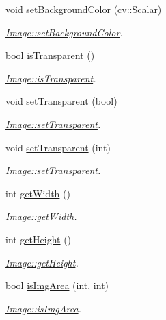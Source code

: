 \begin{DoxyCompactItemize}
void \mbox{\hyperlink{class_image_a4262b756a7298a7b6f5ad840c56b41e6}{set\+Background\+Color}} (cv\+::\+Scalar)
\begin{DoxyCompactList}\small\item\em \mbox{\hyperlink{class_image_a4262b756a7298a7b6f5ad840c56b41e6}{Image\+::set\+Background\+Color}}. \end{DoxyCompactList}\item 
bool \mbox{\hyperlink{class_image_a2bfbc65ec280b866411462f7b452ce76}{is\+Transparent}} ()
\begin{DoxyCompactList}\small\item\em \mbox{\hyperlink{class_image_a2bfbc65ec280b866411462f7b452ce76}{Image\+::is\+Transparent}}. \end{DoxyCompactList}\item 
void \mbox{\hyperlink{class_image_a52e45825bdd0de9b53c36b1a80936cca}{set\+Transparent}} (bool)
\begin{DoxyCompactList}\small\item\em \mbox{\hyperlink{class_image_a52e45825bdd0de9b53c36b1a80936cca}{Image\+::set\+Transparent}}. \end{DoxyCompactList}\item 
void \mbox{\hyperlink{class_image_aa33101892a02308ad3de2f7eaf22a7a5}{set\+Transparent}} (int)
\begin{DoxyCompactList}\small\item\em \mbox{\hyperlink{class_image_a52e45825bdd0de9b53c36b1a80936cca}{Image\+::set\+Transparent}}. \end{DoxyCompactList}\item 
int \mbox{\hyperlink{class_image_af2720a072812763395512fc3c8c21362}{get\+Width}} ()
\begin{DoxyCompactList}\small\item\em \mbox{\hyperlink{class_image_af2720a072812763395512fc3c8c21362}{Image\+::get\+Width}}. \end{DoxyCompactList}\item 
int \mbox{\hyperlink{class_image_aa4e1f064e5e1f3f04ad605408f1ec3af}{get\+Height}} ()
\begin{DoxyCompactList}\small\item\em \mbox{\hyperlink{class_image_aa4e1f064e5e1f3f04ad605408f1ec3af}{Image\+::get\+Height}}. \end{DoxyCompactList}\item 
bool \mbox{\hyperlink{class_image_aaaf159e089ee155ed25a44424f428506}{is\+Img\+Area}} (int, int)
\begin{DoxyCompactList}\small\item\em \mbox{\hyperlink{class_image_aaaf159e089ee155ed25a44424f428506}{Image\+::is\+Img\+Area}}. \end{DoxyCompactList}\item 

\end{DoxyCompactItemize}
